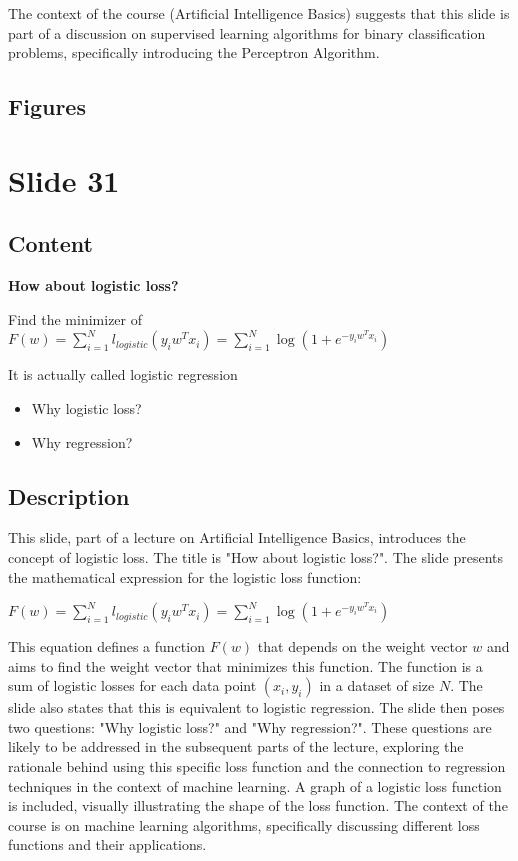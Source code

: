 \documentclass{article}%
\begin{document}
The context of the course (Artificial Intelligence Basics) suggests that this slide is part of a discussion on supervised learning algorithms for binary classification problems, specifically introducing the Perceptron Algorithm.%
\subsection{Figures}%
\begin{figure}[H]%
\centering%
\end{figure}

%
\newpage%
\section{Slide 31}%
\label{sec:Slide31}%
\subsection{Content}%

\textbf{How about logistic loss?}

Find the minimizer of
$F(w) = \sum_{i=1}^N l_{logistic}(y_i w^T x_i) = \sum_{i=1}^N \log(1 + e^{-y_i w^T x_i})$

It is actually called logistic regression

\begin{itemize}
    \item Why logistic loss?
    \item Why regression?
\end{itemize}
%
\subsection{Description}%
This slide, part of a lecture on Artificial Intelligence Basics, introduces the concept of logistic loss.  The title is "How about logistic loss?".  The slide presents the mathematical expression for the logistic loss function:

$F(w) = \sum_{i=1}^N l_{logistic}(y_i w^T x_i) = \sum_{i=1}^N \log(1 + e^{-y_i w^T x_i})$

This equation defines a function $F(w)$ that depends on the weight vector $w$ and aims to find the weight vector that minimizes this function.  The function is a sum of logistic losses for each data point $(x_i, y_i)$ in a dataset of size $N$.  The slide also states that this is equivalent to logistic regression.  The slide then poses two questions: "Why logistic loss?" and "Why regression?".  These questions are likely to be addressed in the subsequent parts of the lecture, exploring the rationale behind using this specific loss function and the connection to regression techniques in the context of machine learning.  A graph of a logistic loss function is included, visually illustrating the shape of the loss function. The context of the course is on machine learning algorithms, specifically discussing different loss functions and their applications.%
\end{document}
